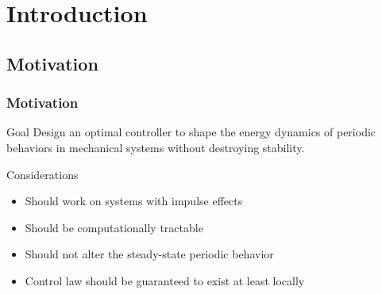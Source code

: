 \section{Introduction}
\showtoc

\subsection{Motivation}

\begin{frame}[t]
  \frametitle{Motivation}
   {
    \begin{block}{Goal}
      Design an optimal controller to shape the energy dynamics of periodic
      behaviors in mechanical systems without destroying stability.
    \end{block}

    \begin{block}{Considerations}
      \begin{itemize}
      \item Should work on systems with impulse effects
      \item Should be computationally tractable
      \item Should not alter the steady-state periodic behavior
      \item Control law should be guaranteed to exist at least locally
      \end{itemize}
    \end{block}
  }

\end{frame}

